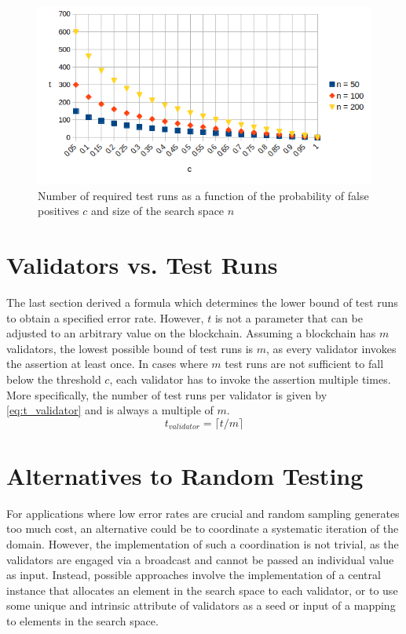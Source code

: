 \begin{figure}[h]
\includegraphics[width=0.95\linewidth]{figures/4-probabilistic_model/graph_t_c}
\caption{Number of required test runs as a function of the probability of false positives $c$ and size of the search space $n$}
\label{fig:graph_t_c}
\end{figure}

\section{Validators vs. Test Runs}
The last section derived a formula which determines the lower bound of test runs to obtain a specified error rate. However, $t$ is not a parameter that can be adjusted to an arbitrary value on the blockchain. Assuming a blockchain has $m$ validators, the lowest possible bound of test runs is $m$, as every validator invokes the assertion at least once. In cases where $m$ test runs are not sufficient to fall below the threshold $c$, each validator has to invoke the assertion multiple times. More specifically, the number of test runs per validator is given by \eqref{eq:t_validator} and is always a multiple of $m$.
\begin{equation}\label{eq:t_validator}
t_{validator} = \lceil t / m \rceil
\end{equation}

\section{Alternatives to Random Testing}\label{sec:alt_random}
For applications where low error rates are crucial and random sampling generates too much cost, an alternative could be to coordinate a systematic iteration of the domain. However, the implementation of such a coordination is not trivial, as the validators are engaged via a broadcast and cannot be passed an individual value as input. Instead, possible approaches involve the implementation of a central instance that allocates an element in the search space to each validator, or to use some unique and intrinsic attribute of validators as a seed or input of a mapping to elements in the search space.

